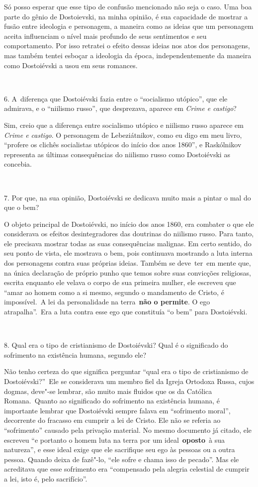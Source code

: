 Só posso esperar que esse tipo de confusão mencionado não seja o caso.
Uma boa parte do gênio de Dostoievski, na minha opinião, é sua
capacidade de mostrar a fusão entre ideologia e personagem, a maneira
como as ideias que um personagem aceita influenciam o nível mais
profundo de seus sentimentos e seu comportamento. Por isso retratei o
efeito dessas ideias nos atos dos personagens, mas também tentei esboçar
a ideologia da época, independentemente da maneira como Dostoiévski a
usou em seus romances.

~

6. A~diferença que Dostoiévski fazia entre o ``socialismo utópico'', que
ele admirava, e o ``niilismo russo'', que desprezava, aparece em \emph{Crime e
castigo}?

Sim, creio que a diferença entre socialismo utópico e niilismo russo
aparece em \emph{Crime e castigo}. O personagem de Lebeziátnikov, como eu
digo em meu livro, ``profere os clichês socialistas utópicos do início
dos anos 1860'', e Raskólnikov representa as últimas consequências do
niilismo russo como Dostoiévski as concebia.

~

7. Por que, na sua opinião, Dostoiévski se dedicava muito mais a pintar
o mal do que o bem?

O objeto principal de Dostoiévski, no início dos anos 1860, era combater
o que ele considerava os efeitos desintegradores das doutrinas do
niilismo russo. Para tanto, ele precisava mostrar todas as suas
consequências malignas. Em certo sentido, do seu ponto de vista, ele
mostrava o bem, pois continuava mostrando a luta interna dos personagens
contra suas próprias ideias. Também se deve~ter~em mente que, na única
declaração de próprio punho que temos sobre suas convicções religiosas,
escrita enquanto ele velava o corpo de sua primeira mulher, ele escreveu
que ``amar ao homem como a si mesmo, segundo o mandamento de Cristo, é
impossível.~A lei da personalidade na terra~\textbf{não o permite}. O
ego atrapalha''.~Era a luta contra esse ego que constituía ``o bem'' para
Dostoiévski.

~

8. Qual era o tipo de cristianismo de Dostoiévski? Qual é o significado
do sofrimento na existência humana, segundo ele?

Não tenho certeza do que significa perguntar ``qual era o tipo de
cristianismo de Dostoiévski?''~Ele se considerava um membro fiel da
Igreja Ortodoxa Russa, cujos dogmas, deve"-se lembrar, são muito mais
fluidos que os da Católica Romana.~Quanto ao significado do sofrimento
na existência humana, é importante lembrar que Dostoiévski sempre falava
em ``sofrimento moral'', decorrente do fracasso em cumprir a lei de
Cristo. Ele não se referia ao ``sofrimento'' causado pela privação
material. No mesmo documento já citado, ele escreveu ``e portanto o homem
luta na terra por um ideal~{\textbf{oposto}~}à sua natureza'', e esse
ideal exige que ele sacrifique seu ego às pessoas ou a outra pessoa.
Quando deixa de fazê"-lo, ``ele sofre e chama isso de pecado''. Mas ele
acreditava que esse sofrimento era ``compensado pela alegria celestial de
cumprir a lei, isto é, pelo sacrifício''.

